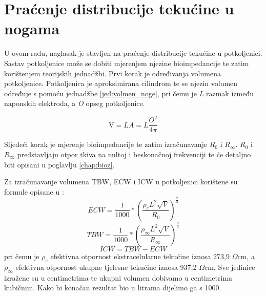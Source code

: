 \documentclass[../diplomski_rad.tex]{subfiles}
\begin{document}

\section{Praćenje distribucije tekućine u nogama}

U ovom radu, naglasak je stavljen na praćenje distribucije tekućine u potkoljenici. 
Sastav potkoljenice može se dobiti mjerenjem njezine bioimpedancije te zatim korištenjem teorijskih jednadžbi. 
Prvi korak je određivanja volumena potkoljenice. 
Potkoljenica je aproksimirana cilindrom te se njezin volumen određuje s pomoću jednadžbe \ref{jed:volmen_noge}, 
pri čemu je \textit{L} razmak između naponskih elektroda, a \textit{O} opseg potkoljenice.

\begin{equation}
    \label{jed:volmen_noge}
    \mathrm{V}=L A=L \frac{O^2}{4 \pi}
\end{equation} 

Sljedeći korak je mjerenje bioimpedancije te zatim izračunavanje $R_{0}$ i $R_{\infty}$.
$R_{0}$ i $R_{\infty}$ predstavljaju otpor tkiva na nultoj i beskonačnoj frekvenciji te će detaljno biti opisani u poglavlju \ref{chap:bioz}.

Za izračunavanje volumena TBW, ECW i ICW u potkoljenici korištene su formule opisane u \cite{Delano2022}:
\begin{equation}
    \label{jed:ecw_noge}
    ECW=\frac{1}{1000} *\left(\frac{\rho_e L^2 \sqrt{V}}{R_0}\right)^{\frac{2}{3}}
\end{equation} 
\begin{equation}
    \label{jed:tbw_noge}
    TBW=\frac{1}{1000} *\left(\frac{\rho_{\infty} L^2 \sqrt{V}}{R_{\infty}}\right)^{\frac{2}{3}}
\end{equation} 
\begin{equation}
    \label{jed:icw_noge}
    ICW=TBW-ECW 
\end{equation} 
pri čemu je $\rho_{e}$ efektivna otpornost ekstracelularne tekućine iznosa 273,9 $\Omega$cm, a 
$\rho_{\infty}$ efektivna otpornost ukupne tjelesne tekućine iznosa 937,2 $\Omega$cm.
Sve jedinice izražene su u centimetrima te ukupni volumen dobivamo u centimetrima kubičnim. 
Kako bi konačan rezultat bio u litrama dijelimo ga s 1000. 
\end{document}
